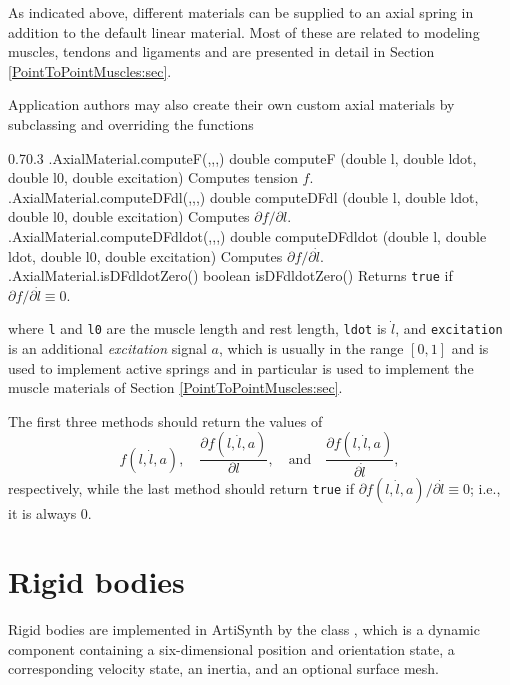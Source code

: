 As indicated above, different materials can be supplied to an axial spring in
addition to the default linear material. Most of these are related to modeling
muscles, tendons and ligaments and are presented in detail in
Section \ref{PointToPointMuscles:sec}.

Application authors may also create their own custom axial materials by
subclassing
and overriding the functions
%
\begin{methodtable}{0.7}{0.3}
\midline
%
\methodentry
{\mats.AxialMaterial.computeF(,,,)}%
{double computeF (double l, double ldot, double l0, double excitation)}%
{Computes tension $f$.}%
%
\methodentry
{\mats.AxialMaterial.computeDFdl(,,,)}%
{double computeDFdl (double l, double ldot, double l0, double excitation)}%
{Computes $\partial f/\partial l$.}%
%
\methodentry
{\mats.AxialMaterial.computeDFdldot(,,,)}%
{double computeDFdldot (double l, double ldot, double l0, double excitation)}%
{Computes $\partial f/\partial \dot l$.}%
%
\methodentry
{\mats.AxialMaterial.isDFdldotZero()}%
{boolean isDFdldotZero()}%
{Returns {\tt true} if $\partial f/\partial \dot l \equiv 0$.}%
%
\midline
\end{methodtable}
%
where {\tt l} and {\tt l0} are the muscle length and rest length, {\tt ldot} is
$\dot l$, and {\tt excitation} is an additional {\it excitation} signal $a$,
which is usually in the range $[0, 1]$ and is used to implement active springs
and in particular is used to implement the muscle materials of
Section \ref{PointToPointMuscles:sec}.

The first three methods should return the values of 
%
\begin{equation}
f (l, \dot l, a), \quad
\frac{\partial f(l, \dot l, a)}{\partial l}, \quad \text{and} \quad
\frac{\partial f(l, \dot l, a)}{\partial \dot l},
\end{equation}
%
respectively, while the last method should return {\tt true} if
$\partial f(l, \dot l, a) / \partial \dot l \equiv 0$; i.e., it is
always 0.

\section{Rigid bodies}

Rigid bodies are implemented in ArtiSynth by the class
, which is a dynamic
component containing a six-dimensional position and orientation state,
a corresponding velocity state, an inertia, and an optional surface
mesh.

